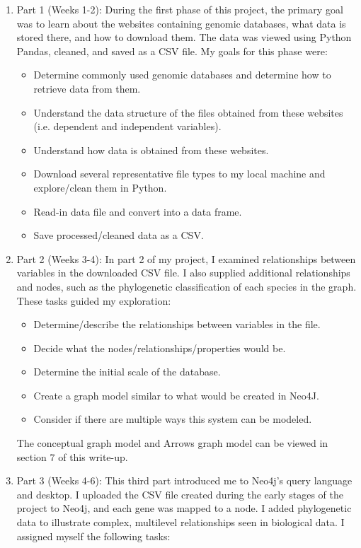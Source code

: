 \documentclass[]{article}
\begin{document}
\begin{enumerate}

\item Part 1 (Weeks 1-2):
During the first phase of this project, the primary goal was to learn about the websites containing genomic databases, what data is stored there, and how to download them.  The data was viewed using Python Pandas, cleaned, and saved as a CSV file. My goals for this phase were:

\begin{itemize}
\item Determine commonly used genomic databases and determine how to retrieve data from them.
\item Understand the data structure of the files obtained from these websites (i.e. dependent and independent variables).
\item Understand how data is obtained from these websites.
\item Download several representative file types to my local machine and explore/clean them in Python.
\item Read-in data file and convert into a data frame.
\item Save processed/cleaned data as a CSV.
\end{itemize}


\item Part 2 (Weeks 3-4):  In part 2 of my project, I examined relationships between variables in the downloaded CSV file.  I also supplied additional relationships and nodes, such as the phylogenetic classification of each species in the graph.  These tasks guided my exploration:

\begin{itemize}
	
\item Determine/describe the relationships between variables in the file. 
\item Decide what the nodes/relationships/properties would be.
\item Determine the initial scale of the database. 
\item Create a graph model similar to what would be created in Neo4J.
\item Consider if there are multiple ways this system can be modeled.
\end{itemize}

The conceptual graph model and Arrows graph model can be viewed in section 7 of this write-up.

\item Part 3 (Weeks 4-6):  This third part introduced me to Neo4j's query language and desktop. I uploaded the CSV file created during the early stages of the project to Neo4j, and each gene was mapped to a node. I added phylogenetic data to illustrate complex, multilevel relationships seen in biological data.  I assigned myself the following tasks:


\end{enumerate}
\end{document}

